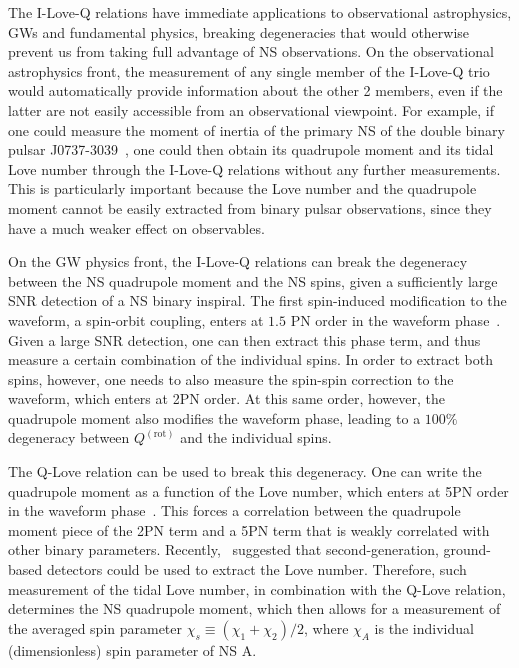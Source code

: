 \documentclass[aps,twocolumn,nofootinbib,showpacs,superscriptaddress,hyperref]{revtex4-1}
\newcommand{\rot}{\mathrm{(rot)}}
\begin{document}
The I-Love-Q relations have immediate applications to observational astrophysics, GWs and fundamental physics, breaking degeneracies that would otherwise prevent us from taking full advantage of NS observations. On the observational astrophysics front, the measurement of any single member of the I-Love-Q trio would automatically provide information about the other 2 members, even if the latter are not easily accessible from an observational viewpoint. For example, if one could measure the moment of inertia of the primary NS of the double binary pulsar J0737-3039~\cite{burgay,lyne,kramer-double-pulsar}, one could then obtain its quadrupole moment and its tidal Love number through the I-Love-Q relations without any further measurements. This is particularly important because the Love number and the quadrupole moment cannot be easily extracted from binary pulsar observations, since they have a much weaker effect on observables.

On the GW physics front, the I-Love-Q relations can break the degeneracy between the NS quadrupole moment and the NS spins, given a sufficiently large SNR detection of a NS binary inspiral. The first spin-induced modification to the waveform, a spin-orbit coupling, enters at $1.5$ PN order in the waveform phase~\cite{kidder-spin}. Given a large SNR detection, one can then extract this phase term, and thus measure a certain combination of the individual spins. In order to extract both spins, however, one needs to also measure the spin-spin correction to the waveform, which enters at 2PN order. At this same order, however, the quadrupole moment also modifies the waveform phase, leading to a $100\%$ degeneracy between $Q^\rot$ and the individual spins. 

The Q-Love relation can be used to break this degeneracy. One can write the quadrupole moment as a function of the Love number, which enters at 5PN order in the waveform phase~\cite{flanagan-hinderer-love}. This forces a correlation between the quadrupole moment piece of the 2PN term and a 5PN term that is weakly correlated with other binary parameters. Recently,~\cite{lackey,damour-nagar-villain} suggested that second-generation, ground-based detectors could be used to extract the Love number. Therefore, such measurement of the tidal Love number, in combination with the Q-Love relation, determines the NS quadrupole moment, which then allows for a measurement of the averaged spin parameter $\chi_s \equiv (\chi_1 + \chi_2)/2$, where $\chi_{A}$ is the individual (dimensionless) spin parameter of NS A.  
\end{document}
